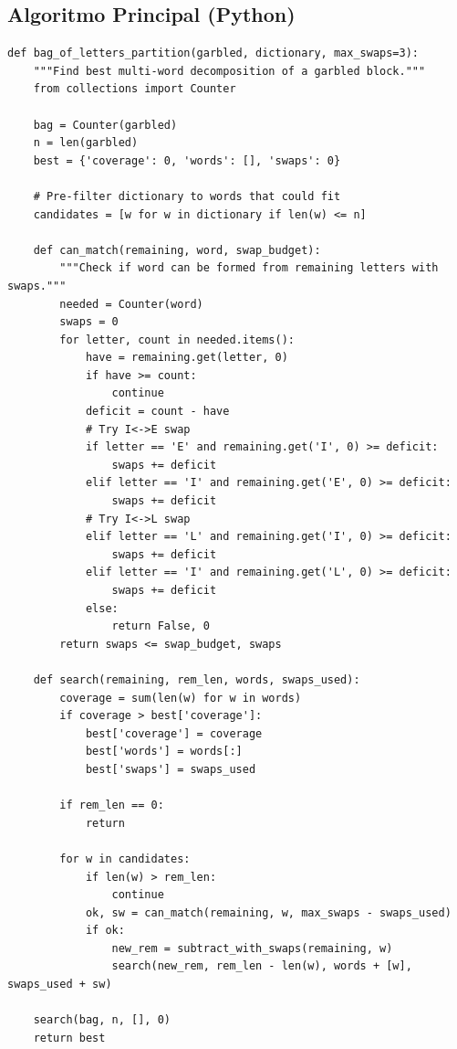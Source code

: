 \documentclass[11pt,a4paper]{article}
\begin{document}
\subsection{Algoritmo Principal (Python)}

\begin{lstlisting}[style=python]
def bag_of_letters_partition(garbled, dictionary, max_swaps=3):
    """Find best multi-word decomposition of a garbled block."""
    from collections import Counter

    bag = Counter(garbled)
    n = len(garbled)
    best = {'coverage': 0, 'words': [], 'swaps': 0}

    # Pre-filter dictionary to words that could fit
    candidates = [w for w in dictionary if len(w) <= n]

    def can_match(remaining, word, swap_budget):
        """Check if word can be formed from remaining letters with swaps."""
        needed = Counter(word)
        swaps = 0
        for letter, count in needed.items():
            have = remaining.get(letter, 0)
            if have >= count:
                continue
            deficit = count - have
            # Try I<->E swap
            if letter == 'E' and remaining.get('I', 0) >= deficit:
                swaps += deficit
            elif letter == 'I' and remaining.get('E', 0) >= deficit:
                swaps += deficit
            # Try I<->L swap
            elif letter == 'L' and remaining.get('I', 0) >= deficit:
                swaps += deficit
            elif letter == 'I' and remaining.get('L', 0) >= deficit:
                swaps += deficit
            else:
                return False, 0
        return swaps <= swap_budget, swaps

    def search(remaining, rem_len, words, swaps_used):
        coverage = sum(len(w) for w in words)
        if coverage > best['coverage']:
            best['coverage'] = coverage
            best['words'] = words[:]
            best['swaps'] = swaps_used

        if rem_len == 0:
            return

        for w in candidates:
            if len(w) > rem_len:
                continue
            ok, sw = can_match(remaining, w, max_swaps - swaps_used)
            if ok:
                new_rem = subtract_with_swaps(remaining, w)
                search(new_rem, rem_len - len(w), words + [w], swaps_used + sw)

    search(bag, n, [], 0)
    return best
\end{lstlisting}
\end{document}
